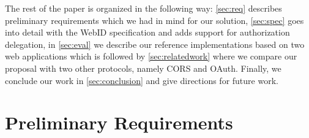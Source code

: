 \documentclass[a4paper]{llncs}
\begin{document}
The rest of the paper is organized in the following way:
\autoref{sec:req} describes preliminary requirements which we had in mind for our solution,
\autoref{sec:spec} goes into detail with the WebID specification and adds support for authorization delegation,
in \autoref{sec:eval} we describe our reference implementations based on two web applications which is followed by \autoref{sec:relatedwork} where we compare our proposal with two other protocols, namely CORS and OAuth.
Finally, we conclude our work in \autoref{sec:conclusion} and give directions for future work.


\section{Preliminary Requirements}\label{sec:req}




\end{document}
